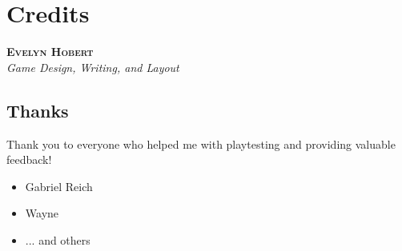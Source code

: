 \documentclass[
    statementpaper, %
    11pt, %
    oneside, 
    onecolumn, %
    openany, %
]{memoir}
\begin{document}
    \chapter*{Credits}
    \thispagestyle{empty} %
    \newcommand{\creditsname}[1]{{\Large\scshape\textbf{#1}}}
    {
        \setlength{\columnseprule}{0pt}
        \raggedcolumns

        \begin{vplace}
            \begin{center}
                \creditsname{Evelyn Hobert}\\
                \textit{Game Design, Writing, and Layout}
            \end{center}
        \end{vplace}
    
        
        \section*{Thanks}
        Thank you to everyone who helped me with playtesting and providing valuable feedback!
        \begin{multicols}{3}
            \begin{itemize}[wide, label={}, itemindent=0pt, before=\itshape]
                \item Gabriel Reich %
                \item Wayne %
                \item ... and others
            \end{itemize}
        \end{multicols}
        
}
\end{document}
